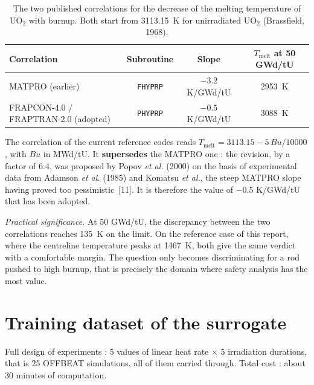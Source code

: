 \documentclass[12pt,a4paper]{report}
\begin{document}
\begin{table}[htbp]
\centering
\caption[UO2 melting correlations]{The two published correlations for the
decrease of the melting temperature of $\mathrm{UO_2}$ with burnup. Both start
from \SI{3113.15}{\kelvin} for unirradiated $\mathrm{UO_2}$ (Brassfield, 1968).}
\label{tab:fusion}
\small
\begin{tabularx}{\textwidth}{@{}Xccc@{}}
\toprule
\textbf{Correlation} & \textbf{Subroutine} & \textbf{Slope} &
\textbf{$T_{\text{melt}}$ at 50 GWd/tU}\\
\midrule
MATPRO (earlier) & \texttt{FHYPRP} & $-3.2$ K/GWd/tU
  & \SI{2953}{\kelvin}\\
FRAPCON-4.0 / FRAPTRAN-2.0 (adopted) & \texttt{PHYPRP} &
  $-0.5$ K/GWd/tU & \SI{3088}{\kelvin}\\
\bottomrule
\end{tabularx}
\end{table}
The correlation of the current reference codes reads
$T_{\text{melt}} = 3113.15 - 5\,Bu/10000$, with $Bu$ in MWd/tU. It
\textbf{supersedes} the MATPRO one : the revision, by a factor of \num{6.4}, was
proposed by Popov \textit{et al.} (2000) on the basis of experimental data from
Adamson \textit{et al.} (1985) and Komatsu \textit{et al.}, the steep MATPRO
slope having proved too pessimistic~[11]. It is therefore the value of
$-0.5$ K/GWd/tU that has been adopted.

\vspace{0.3cm}
\noindent
\textit{Practical significance.} At 50 GWd/tU, the discrepancy between the two
correlations reaches \SI{135}{\kelvin} on the limit. On the reference case of
this report, where the centreline temperature peaks at \SI{1467}{\kelvin}, both
give the same verdict with a comfortable margin. The question only becomes
discriminating for a rod pushed to high burnup, that is precisely the domain
where safety analysis has the most value.

\section{Training dataset of the surrogate}
\label{ann:dataset}

\noindent Full design of experiments : \num{5} values of linear heat rate
$\times$ \num{5} irradiation durations, that is \num{25} OFFBEAT simulations,
all of them carried through. Total cost : about \num{30} minutes of computation.
\end{document}
